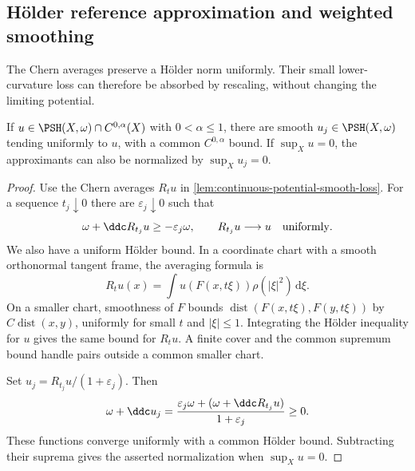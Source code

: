 \subsection{H\"older reference approximation and weighted smoothing}

The Chern averages preserve a H\"older norm uniformly. Their small lower-curvature loss can therefore be absorbed by rescaling, without changing the limiting potential.

\begin{lemma}\label{lem:smooth-holder-reference-approximation}
If $u\in\PSH(X,\omega)\cap C^{0,\alpha}(X)$ with $0<\alpha\leq1$, there are smooth $u_j\in\PSH(X,\omega)$ tending uniformly to $u$, with a common $C^{0,\alpha}$ bound. If $\sup_Xu=0$, the approximants can also be normalized by $\sup_Xu_j=0$.
\end{lemma}
\begin{proof}
Use the Chern averages $R_tu$ in \cref{lem:continuous-potential-smooth-loss}. For a sequence $t_j\downarrow0$ there are $\varepsilon_j\downarrow0$ such that
\[
 \omega+\ddc R_{t_j}u\geq-\varepsilon_j\omega,
 \qquad R_{t_j}u\longrightarrow u\quad\text{uniformly}.
\]
We also have a uniform H\"older bound. In a coordinate chart with a smooth orthonormal tangent frame, the averaging formula is
\[
 R_tu(x)=\int u(F(x,t\xi))\rho(|\xi|^2)\,\mathrm d\xi.
\]
On a smaller chart, smoothness of $F$ bounds $\operatorname{dist}(F(x,t\xi),F(y,t\xi))$ by $C\operatorname{dist}(x,y)$, uniformly for small $t$ and $|\xi|\leq1$. Integrating the H\"older inequality for $u$ gives the same bound for $R_tu$. A finite cover and the common supremum bound handle pairs outside a common smaller chart.

Set $u_j=R_{t_j}u/(1+\varepsilon_j)$. Then
\[
 \omega+\ddc u_j
 =\frac{\varepsilon_j\omega+(\omega+\ddc R_{t_j}u)}{1+\varepsilon_j}\geq0.
\]
These functions converge uniformly with a common H\"older bound. Subtracting their suprema gives the asserted normalization when $\sup_Xu=0$.
\end{proof}

